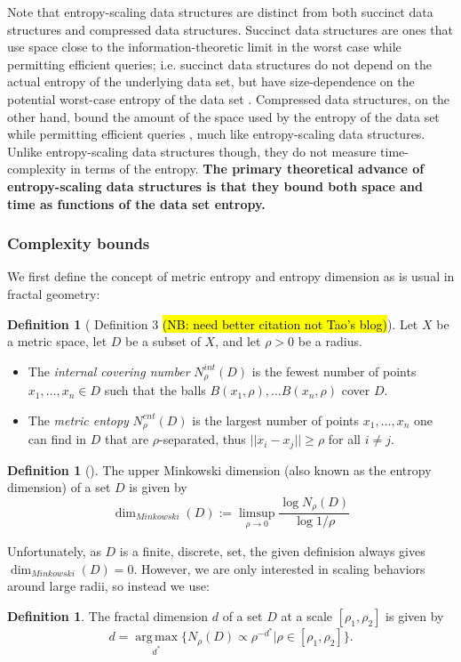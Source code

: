 \documentclass[review,preprint,12pt]{elsarticle}
\theoremstyle{definition}
\newtheorem{definition}[theorem]{Definition}
\theoremstyle{remark}
\numberwithin{equation}{section}
\begin{document}
Note that entropy-scaling data structures are distinct from both succinct data structures and compressed data structures.
Succinct data structures are ones that use space close to the information-theoretic limit in the worst case while permitting efficient queries; i.e.
succinct data structures do not depend on the actual entropy of the underlying data set, but have size-dependence on the potential worst-case entropy of the data set \cite{jacobson1988succinct}.
Compressed data structures, on the other hand, bound the amount of the space used by the entropy of the data set while permitting efficient queries \cite{grossi2005compressed, ferragina2000opportunistic}, much like entropy-scaling data structures.
Unlike entropy-scaling data structures though, they do not measure time-complexity in terms of the entropy.
\textbf{The primary theoretical advance of entropy-scaling data structures is that they bound both space and time as functions of the data set entropy.}

\subsubsection{Complexity bounds}
We first define the concept of metric entropy and entropy dimension as is usual in fractal geometry:
\begin{definition}[\cite{tao2014metric} Definition 3 \hl{(NB: need better citation not Tao's blog)}]
    Let $X$ be a metric space, let $D$ be a subset of $X$, and let $\rho>0$ be a radius.
    \begin{itemize}
        \item The \textit{internal covering number} $N_\rho^{int}(D)$ is the fewest number of points $x_1, \ldots, x_n \in D$ such that the balls $B(x_1,\rho), \ldots B(x_n,\rho)$ cover $D$.
        \item The \textit{metric entopy} $N_\rho^{ent}(D)$ is the largest number of points $x_1, \ldots, x_n$ one can find in $D$ that are $\rho$-separated, thus $||x_i - x_j|| \ge \rho$ for all $i \ne j$.
    \end{itemize}
\end{definition}
\begin{definition}[\cite{falconer2013fractal}]
    The upper Minkowski dimension (also known as the entropy dimension) of a set $D$ is given by 
\[
    \dim_{Minkowski}(D) := \limsup_{\rho \to 0} \frac{\log N_\rho(D)}{\log 1/\rho}
\]
\end{definition}
Unfortunately, as $D$ is a finite, discrete, set, the given definision always gives $\dim_{Minkowski}(D) = 0$.
However, we are only interested in scaling behaviors around large radii, so instead we use:
\begin{definition}
    The fractal dimension $d$ of a set $D$ at a scale $[\rho_1,\rho_2]$ is given by
    \[
        d = \operatorname*{arg\,max}_{d^*} \{ N_\rho(D) \propto \rho^{-d^*} | \rho \in [\rho_1,\rho_2] \}.
    \]
\end{definition}
\end{document}
